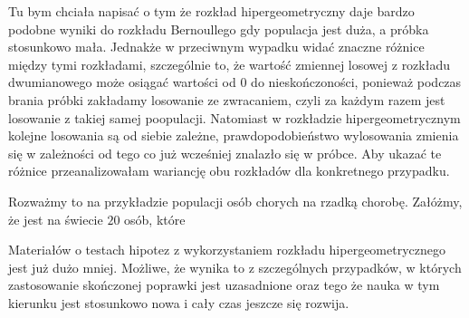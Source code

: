 \documentclass[twoside,a4paper,12pt]{book}
\begin{document}
Tu bym chciała napisać o tym że rozkład hipergeometryczny daje bardzo podobne wyniki do rozkładu Bernoullego gdy populacja jest duża, a  próbka stosunkowo mała. Jednakże w przeciwnym wypadku widać znaczne różnice między tymi rozkładami, szczególnie to, że wartość zmiennej losowej z rozkładu dwumianowego może osiągać wartości od $0$ do nieskończoności, ponieważ podczas brania próbki zakładamy losowanie ze zwracaniem, czyli za każdym razem jest losowanie z takiej samej poopulacji. Natomiast w rozkładzie hipergeometrycznym kolejne losowania są od siebie zależne, prawdopodobieństwo wylosowania zmienia się w zależności od tego co już wcześniej znalazło się w próbce. Aby ukazać te różnice przeanalizowałam wariancję obu rozkładów dla konkretnego przypadku.

Rozważmy to na przykładzie populacji osób chorych na rzadką chorobę. Załóżmy, że jest na świecie $20$ osób, które 




Materiałów o testach hipotez z wykorzystaniem rozkładu hipergeometrycznego jest już dużo mniej. Możliwe, że wynika to z szczególnych przypadków, w których zastosowanie skończonej poprawki jest uzasadnione oraz tego że nauka w tym kierunku jest stosunkowo nowa i cały czas jeszcze się rozwija.
	


	
\end{document}
